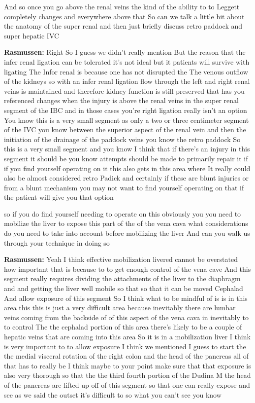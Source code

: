 \documentclass[
]{book}
\begin{document}
And so once you go above the renal veins the kind of the ability to to Leggett completely changes and everywhere above that So can we talk a little bit about the anatomy of the super renal and then just briefly discuss retro paddock and super hepatic IVC

\textbf{Rasmussen:} Right So I guess we didn't really mention But the reason that the infer renal ligation can be tolerated it's not ideal but it patients will survive with ligating The Infor renal is because one has not disrupted the The venous outflow of the kidneys so with an infer renal ligation flow through the left and right renal veins is maintained and therefore kidney function is still preserved that has you referenced changes when the injury is above the renal veins in the super renal segment of the IBC and in those cases you're right ligation really isn't an option You know this is a very small segment as only a two or three centimeter segment of the IVC you know between the superior aspect of the renal vein and then the initiation of the drainage of the paddock veins you know the retro paddock So this is a very small segment and you know I think that if there's an injury in this segment it should be you know attempts should be made to primarily repair it if if you find yourself operating on it this also gets in this area where It really could also be almost considered retro Padick and certainly if these are blunt injuries or from a blunt mechanism you may not want to find yourself operating on that if the patient will give you that option

so if you do find yourself needing to operate on this obviously you you need to mobilize the liver to expose this part of the of the vena cava what considerations do you need to take into account before mobilizing the liver And can you walk us through your technique in doing so

\textbf{Rasmussen:} Yeah I think effective mobilization livered cannot be overstated how important that is because to to get enough control of the vena cave And this segment really requires dividing the attachments of the liver to the diaphragm and and getting the liver well mobile so that so that it can be moved Cephalad And allow exposure of this segment So I think what to be mindful of is is in this area this this is just a very difficult area because inevitably there are lumbar veins coming from the backside of of this aspect of the vena cava in inevitably to to control The the cephalad portion of this area there's likely to be a couple of hepatic veins that are coming into this area So it is in a mobilization liver I think is very important to to allow exposure I think we mentioned I guess to start the the medial visceral rotation of the right colon and the head of the pancreas all of that has to really be I think maybe to your point make sure that that exposure is also very thorough so that the the third fourth portion of the Dudina M the head of the pancreas are lifted up off of this segment so that one can really expose and see as we said the outset it's difficult to so what you can't see you know
\end{document}

